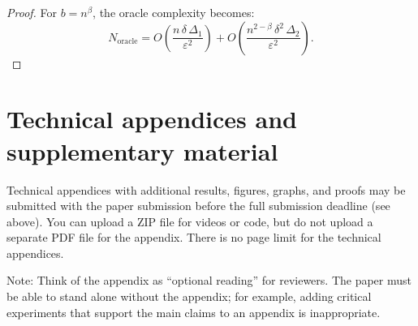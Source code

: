 \documentclass{article}
\begin{document}
\begin{proof}

For $b = n^\beta$, 
the oracle complexity becomes:
\[
N_{\text{oracle}} 
= O\!\left(\frac{n\,\delta\,\Delta_1}{\varepsilon^2}\right) 
+ O\!\left(\frac{n^{2-\beta}\,\delta^2\,\Delta_2}
{\varepsilon^2}\right).
\]


    
\end{proof}



\section{Technical appendices and supplementary material}
Technical appendices with additional results, figures, graphs, and proofs may be submitted with the paper submission before the full submission deadline (see above). You can upload a ZIP file for videos or code, but do not upload a separate PDF file for the appendix. There is no page limit for the technical appendices. 

Note: Think of the appendix as ``optional reading'' for reviewers. The paper must be able to stand alone without the appendix; for example, adding critical experiments that support the main claims to an appendix is inappropriate. 


\end{document}
